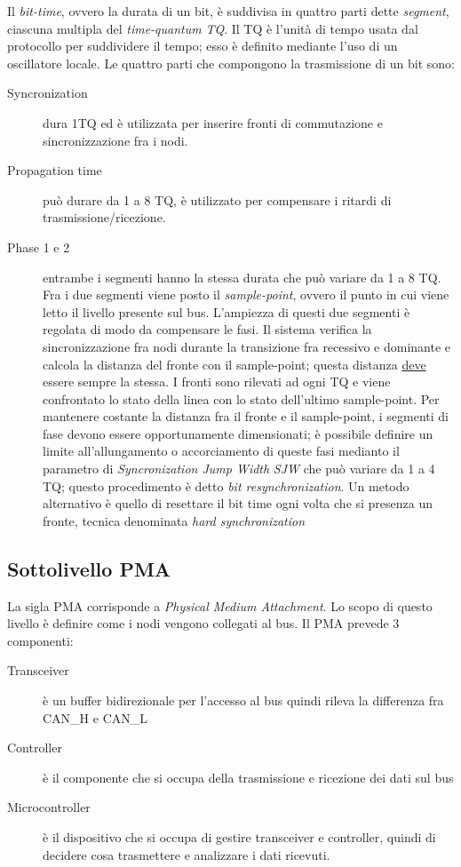 \documentclass[a4paper,10pt]{book}
\begin{document}
Il \textit{bit-time}, ovvero la durata di un bit, è suddivisa in
quattro parti dette \textit{segment}, ciascuna multipla del
\textit{time-quantum} \textit{TQ}. Il TQ è l'unità di tempo usata dal
protocollo per suddividere il tempo; esso è definito mediante l'uso di
un oscillatore locale. Le quattro parti che compongono la trasmissione
di un bit sono:
\begin{description}
 \item[Syncronization] dura 1TQ ed è utilizzata per inserire fronti
di commutazione e sincronizzazione fra i nodi.
 \item[Propagation time] può durare da 1 a 8 TQ, è utilizzato per
compensare i ritardi di trasmissione/ricezione.
 \item[Phase 1 e 2] entrambe i segmenti hanno la stessa durata che
può variare da 1 a 8 TQ. Fra i due segmenti viene posto il
\textit{sample-point}, ovvero il punto in cui viene letto il livello
presente sul bus. L'ampiezza di questi due segmenti è regolata di modo
da compensare le fasi. Il sistema verifica la sincronizzazione fra
nodi durante la transizione fra recessivo e dominante e calcola la
distanza del fronte con il sample-point; questa distanza
\underline{deve} essere sempre la stessa. I fronti sono rilevati ad
ogni TQ e viene confrontato lo stato della linea con lo stato
dell'ultimo sample-point. Per mantenere costante la distanza fra il
fronte e il sample-point, i segmenti di fase devono essere
opportunamente dimensionati; è possibile definire un limite
all'allungamento o accorciamento di queste fasi medianto il parametro
di \textit{Syncronization Jump Width} \textit{SJW} che può variare da
1 a 4 TQ; questo procedimento è detto \textit{bit resynchronization}.
Un metodo alternativo è quello di resettare il bit time ogni volta
che si presenza un fronte, tecnica denominata \textit{hard
synchronization}
\end{description}


\subsection{Sottolivello PMA}
La sigla PMA corrisponde a \textit{Physical Medium Attachment}. Lo
scopo di questo livello è definire come i nodi vengono collegati al
bus. Il PMA prevede 3 componenti:
\begin{description}
 \item[Transceiver] è un buffer bidirezionale per l'accesso al bus
quindi rileva la differenza fra CAN\_H e CAN\_L
 \item[Controller] è il componente che si occupa della trasmissione e
ricezione dei dati sul bus
 \item[Microcontroller] è il dispositivo che si occupa di gestire
transceiver e controller, quindi di decidere cosa trasmettere e
analizzare i dati ricevuti.
\end{description}
\end{document}
